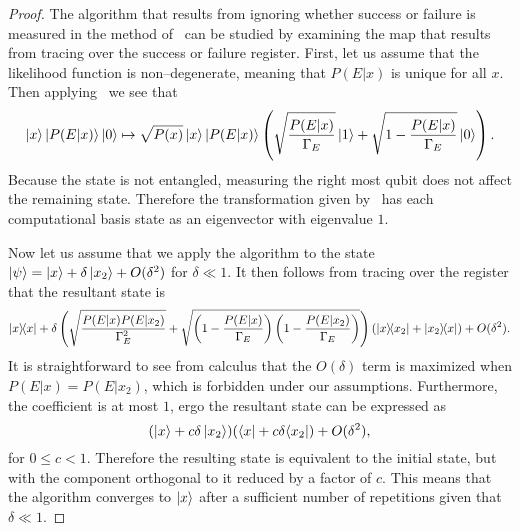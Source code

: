 \documentclass[aps,amsmath,onecolumn,amssymb]{revtex4}
\begin{document}
\begin{proof}
The algorithm that results from ignoring whether success or failure is measured in the method of~ can be studied by examining the map that results from tracing over the success or failure register.
First, let us assume that the likelihood function is non--degenerate, meaning that $P(E|x)$ is unique for all $x$.  Then applying~ we see that
\begin{equation}
\left|x\right\rangle \left|P(E|x)\right\rangle\left|0\right\rangle\mapsto \sqrt{P(x)} \left|x\right\rangle \left|P(E|x)\right\rangle\left(\sqrt{\frac{P(E|x)}{\Gamma_E}}\left|1\right\rangle + \sqrt{1-\frac{P(E|x)}{\Gamma_E}}\left|0\right\rangle \right).
\end{equation}
Because the state is not entangled, measuring the right most qubit does not affect the remaining state.  Therefore the transformation given by~ has each computational basis state as an eigenvector with eigenvalue $1$.

Now let us assume that we apply the algorithm to the state $\left|\psi\right\rangle = \left|x\right\rangle +\delta \left|x_2\right\rangle + O(\delta^2)$ for $\delta\ll 1$.  It then follows from tracing over the register that the resultant state is
\begin{equation}
|x\rangle\!\langle x| + \delta\left(\sqrt{\frac{P(E|x)P(E|x_2)}{\Gamma_E^2}} + \sqrt{\left(1-\frac{P(E|x)}{\Gamma_E}\right)\left(1-\frac{P(E|x_2)}{\Gamma_E}\right)} \right)(|x\rangle\!\langle x_2|+|x_2\rangle\!\langle x|) + O(\delta^2).
\end{equation}
It is straightforward to see from calculus that the $O(\delta)$ term is maximized when $P(E|x)=P(E|x_2)$, which is forbidden under our assumptions.  Furthermore, the coefficient is at most $1$, ergo the resultant state can be expressed as
\begin{equation}
(\left|x\right\rangle + c\delta \left|x_2\right\rangle)(\langle x| + c\delta \langle x_2|) + O(\delta^2),
\end{equation}
for $0\le c<1$.  Therefore the resulting state is equivalent to the initial state, but with the component orthogonal to it reduced by a factor of $c$.  This means that the algorithm converges to $\left|x\right\rangle$ after a sufficient number of repetitions given that $\delta\ll 1$.


\end{proof}
\end{document}
